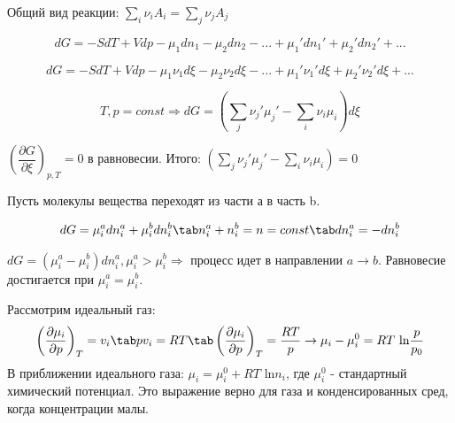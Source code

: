 \begin{lecture}
	Общий вид реакции: $\sum\limits_{i} \nu_i A_i = \sum\limits_{j} \nu_j A_j$
	
	\begin{equation}
	dG = -SdT + Vdp - \mu_1dn_1 - \mu_2dn_2 - ... + \mu_1'dn_1' + \mu_2'dn_2' + ...  
	\end{equation}
	
	\begin{equation}
	dG = -SdT + Vdp - \mu_1\nu_1d\xi - \mu_2\nu_2d\xi - ... + \mu_1'\nu_1'd\xi + \mu_2'\nu_2'd\xi + ...
	\end{equation}

	\begin{equation}
	T,p = const \Rightarrow dG = (\sum\limits_{j} \nu_j'\mu_j' - \sum\limits_{i} \nu_i\mu_i) d \xi
	\end{equation}
	\par $\left( \dfrac{\partial G}{\partial \xi} \right)_{p,T} = 0$ в равновесии. Итого: $(\sum\limits_{j} \nu_j'\mu_j' - \sum\limits_{i} \nu_i\mu_i) = 0$
	
	
	\par Пусть молекулы вещества переходят из части а в часть b. 
	
		\begin{equation}	
	\begin{aligned}
		dG = \mu^a_idn^a_i + \mu^b_idn^b_i \tab n^a_i+n^b_i = n = const \tab dn^a_i = -dn^b_i
	\end{aligned}
	\end{equation}

	$dG = (\mu^a_i - \mu^b_i) dn^a_i, \mu^a_i > \mu^b_i \Rightarrow $ процесс идет в направлении $a \rightarrow b$. Равновесие достигается при $\mu^a_i = \mu^b_i$.
	\par Рассмотрим идеальный газ:
	\begin{equation}	
	\begin{aligned}
	\left(\dfrac{\partial \mu_i}{\partial p}\right)_T = v_i \tab pv_i = RT \tab \left(\dfrac{\partial \mu_i}{\partial p}\right)_T = \frac{RT}{p} \rightarrow \mu_i - \mu_i^0 = RT \text{ ln} \frac{p}{p_0} 
	\end{aligned}
	\end{equation}
	В приближении идеального газа: $\mu_i = \mu_i^0 + RT \text{ ln} n_i$, где $\mu_i^0$ - стандартный химический потенциал. Это выражение верно для газа и конденсированных сред, когда концентрации малы.
	
\end{lecture}
